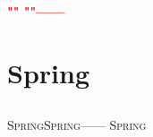 \documentclass[12pt,a4paper]{article}
\theoremstyle{remark}
\newcommand{\Spring}{\textsc{Spring}}
\newcommand{\honestcrit}[1]{%
    \textcolor{red}{\textbf{#1}}%
}
\begin{document}
\honestcrit{""
""——
}

\newpage

\section{Spring}

\subsection{}


\textbf{}\textbf{}

\Spring{}\Spring{}\textbf{}——
\Spring{}

\subsection{}
\end{document}
